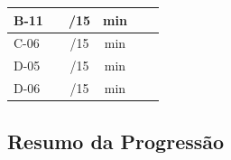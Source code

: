 \begin{center}
\begin{tabular}{|l|c|c|c|c|c|}
\hline
B-11 & \underline{\hspace{1.5cm}} & \underline{\hspace{1cm}}/15 & \underline{\hspace{1cm}}min & \underline{\hspace{1cm}} & \underline{\hspace{2cm}} \\
\hline
C-06 & \underline{\hspace{1.5cm}} & \underline{\hspace{1cm}}/15 & \underline{\hspace{1cm}}min & \underline{\hspace{1cm}} & \underline{\hspace{2cm}} \\
\hline
D-05 & \underline{\hspace{1.5cm}} & \underline{\hspace{1cm}}/15 & \underline{\hspace{1cm}}min & \underline{\hspace{1cm}} & \underline{\hspace{2cm}} \\
\hline
D-06 & \underline{\hspace{1.5cm}} & \underline{\hspace{1cm}}/15 & \underline{\hspace{1cm}}min & \underline{\hspace{1cm}} & \underline{\hspace{2cm}} \\
\hline
\end{tabular}
\end{center}

\subsection{Resumo da Progressão}

